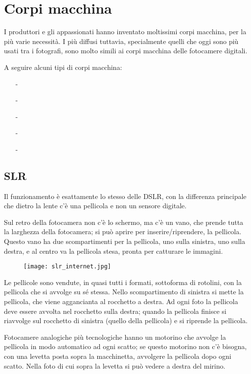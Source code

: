 \section{Corpi macchina} \label{sec:analog_corpimacchina}
I produttori e gli appassionati hanno inventato moltissimi corpi macchina, per la più varie necessità.
I più diffusi tuttavia, specialmente quelli che oggi sono più usati tra i fotografi, sono molto simili ai corpi macchina delle fotocamere digitali.

A seguire alcuni tipi di corpi macchina:
\begin{itemize}
    \item[-] 
    \item[-] 
    \item[-] 
    \item[-] 
    \item[-] 
\end{itemize}

\subsection{SLR} \label{subsec:slr}
Il funzionamento è esattamente lo stesso delle DSLR, con la differenza principale che dietro la lente c'è una pellicola e non un sensore digitale.

Sul retro della fotocamera non c'è lo schermo, ma c'è un vano, che prende tutta la larghezza della fotocamera; si può aprire per inserire/riprendere, la pellicola.
Questo vano ha due scompartimenti per la pellicola, uno sulla sinistra, uno sulla destra, e al centro va la pellicola stesa, pronta per catturare le immagini.

\begin{figure*}[h]
    \centering
    \texttt{[image: slr\_internet.jpg]}
\end{figure*}

Le pellicole sono vendute, in quasi tutti i formati, sottoforma di rotolini, con la pellicola che si avvolge su sé stessa.
Nello scompartimento di sinistra si mette la pellicola, che viene aggancianta al rocchetto a destra.
Ad ogni foto la pellicola deve essere avvolta nel rocchetto sulla destra; quando la pellicola finisce si riavvolge sul rocchetto di sinistra (quello della pellicola) e si riprende la pellicola.

Fotocamere analogiche più tecnologiche hanno un motorino che avvolge la pellicola in modo automatico ad ogni scatto; se questo motorino non c'è bisogna, con una levetta posta sopra la macchinetta, avvolgere la pellicola dopo ogni scatto.
Nella foto di cui sopra la levetta si può vedere a destra del mirino.


